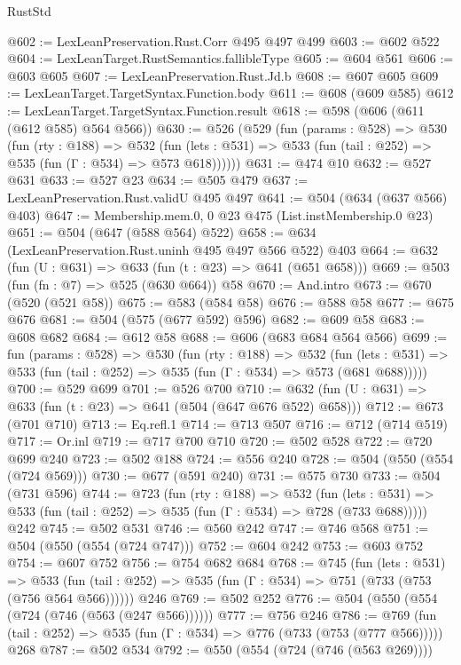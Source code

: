 \begin{lexlean}{RustStd}
\begin{coremodule}
@602 := LexLeanPreservation.Rust.Corr @495 @497 @499
@603 := @602 @522
@604 := LexLeanTarget.RustSemantics.fallibleType
@605 := @604 @561
@606 := @603 @605
@607 := LexLeanPreservation.Rust.Jd.b
@608 := @607 @605
@609 := LexLeanTarget.TargetSyntax.Function.body
@611 := @608 (@609 @585)
@612 := LexLeanTarget.TargetSyntax.Function.result
@618 := @598 (@606 (@611 (@612 @585) @564 @566))
@630 := @526
    (@529
      (fun (params : @528) =>
      @530
        (fun (rty : @188) =>
        @532
          (fun (lets : @531) => @533 (fun (tail : @252) => @535 (fun (Γ : @534) => @573 @618))))))
@631 := @474 @10
@632 := @527 @631
@633 := @527 @23
@634 := @505 @479
@637 := LexLeanPreservation.Rust.validU @495 @497
@641 := @504 (@634 (@637 @566) @403)
@647 := Membership.mem.{0, 0} @23 @475 (List.instMembership.{0} @23)
@651 := @504 (@647 (@588 @564) @522)
@658 := @634 (LexLeanPreservation.Rust.uninh @495 @497 @566 @522) @403
@664 := @632 (fun (U : @631) => @633 (fun (t : @23) => @641 (@651 @658)))
@669 := @503 (fun (fn : @7) => @525 (@630 @664)) @58
@670 := And.intro
@673 := @670 (@520 (@521 @58))
@675 := @583 (@584 @58)
@676 := @588 @58
@677 := @675 @676
@681 := @504 (@575 (@677 @592) @596)
@682 := @609 @58
@683 := @608 @682
@684 := @612 @58
@688 := @606 (@683 @684 @564 @566)
@699 := fun (params : @528) =>
  @530
    (fun (rty : @188) =>
    @532
      (fun (lets : @531) => @533 (fun (tail : @252) => @535 (fun (Γ : @534) => @573 (@681 @688)))))
@700 := @529 @699
@701 := @526 @700
@710 := @632 (fun (U : @631) => @633 (fun (t : @23) => @641 (@504 (@647 @676 @522) @658)))
@712 := @673 (@701 @710)
@713 := Eq.refl.{1}
@714 := @713 @507
@716 := @712 (@714 @519)
@717 := Or.inl
@719 := @717 @700 @710
@720 := @502 @528
@722 := @720 @699 @240
@723 := @502 @188
@724 := @556 @240
@728 := @504 (@550 (@554 (@724 @569)))
@730 := @677 (@591 @240)
@731 := @575 @730
@733 := @504 (@731 @596)
@744 := @723
    (fun (rty : @188) =>
    @532
      (fun (lets : @531) => @533 (fun (tail : @252) => @535 (fun (Γ : @534) => @728 (@733 @688)))))
    @242
@745 := @502 @531
@746 := @560 @242
@747 := @746 @568
@751 := @504 (@550 (@554 (@724 @747)))
@752 := @604 @242
@753 := @603 @752
@754 := @607 @752
@756 := @754 @682 @684
@768 := @745
    (fun (lets : @531) =>
    @533 (fun (tail : @252) => @535 (fun (Γ : @534) => @751 (@733 (@753 (@756 @564 @566))))))
    @246
@769 := @502 @252
@776 := @504 (@550 (@554 (@724 (@746 (@563 (@247 @566))))))
@777 := @756 @246
@786 := @769 (fun (tail : @252) => @535 (fun (Γ : @534) => @776 (@733 (@753 (@777 @566))))) @268
@787 := @502 @534
@792 := @550 (@554 (@724 (@746 (@563 @269))))

\end{coremodule}
\end{lexlean}
